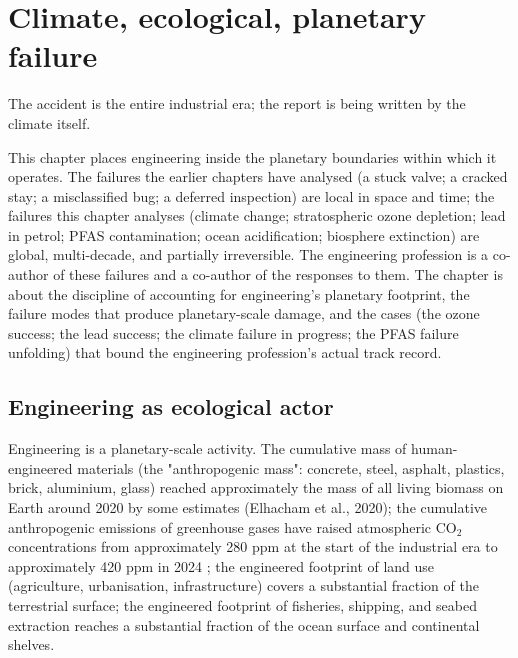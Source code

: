 \chapter{Climate, ecological, planetary failure}
\label{vol10:ch15}

\epigraph{The accident is the entire industrial era; the report is being written by the climate itself.}{}


\noindent
This chapter places engineering inside the planetary boundaries within which it operates. The failures the earlier chapters have analysed (a stuck valve; a cracked stay; a misclassified bug; a deferred inspection) are local in space and time; the failures this chapter analyses (climate change; stratospheric ozone depletion; lead in petrol; PFAS contamination; ocean acidification; biosphere extinction) are global, multi-decade, and partially irreversible. The engineering profession is a co-author of these failures and a co-author of the responses to them. The chapter is about the discipline of accounting for engineering's planetary footprint, the failure modes that produce planetary-scale damage, and the cases (the ozone success; the lead success; the climate failure in progress; the PFAS failure unfolding) that bound the engineering profession's actual track record.

\section{Engineering as ecological actor}

Engineering is a planetary-scale activity. The cumulative mass of human-engineered materials (the "anthropogenic mass": concrete, steel, asphalt, plastics, brick, aluminium, glass) reached approximately the mass of all living biomass on Earth around 2020 by some estimates (Elhacham et al., 2020); the cumulative anthropogenic emissions of greenhouse gases have raised atmospheric CO$_2$ concentrations from approximately 280 ppm at the start of the industrial era to approximately 420 ppm in 2024 \cite{std:ipcc-ar6-wg1-2021}; the engineered footprint of land use (agriculture, urbanisation, infrastructure) covers a substantial fraction of the terrestrial surface; the engineered footprint of fisheries, shipping, and seabed extraction reaches a substantial fraction of the ocean surface and continental shelves.


